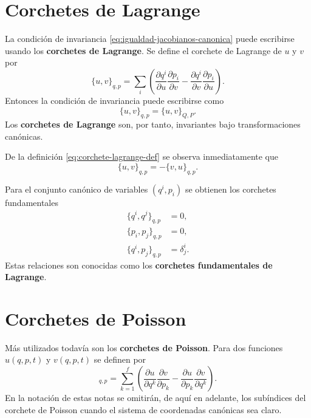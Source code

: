 \documentclass[../apunte_mecanica_clasica.tex]{subfiles}
\begin{document}
\section{Corchetes de Lagrange}

La condición de invariancia \eqref{eq:igualdad-jacobianos-canonica} puede escribirse usando los \textbf{corchetes de Lagrange}. Se define el corchete de Lagrange de $u$ y $v$ por
\begin{equation}
    \{u,v\}_{q,p}
    =
    \sum_i
    \left(
    \frac{\partial q^i}{\partial u}\frac{\partial p_i}{\partial v}
    -
    \frac{\partial q^i}{\partial v}\frac{\partial p_i}{\partial u}
    \right).
    \label{eq:corchete-lagrange-def}
\end{equation}
Entonces la condición de invariancia puede escribirse como
\begin{equation}
    \{u,v\}_{q,p}=\{u,v\}_{Q,P}.
    \label{eq:invariancia-corchetes-lagrange}
\end{equation}
Los \textbf{corchetes de Lagrange} son, por tanto, invariantes bajo transformaciones canónicas.

De la definición \eqref{eq:corchete-lagrange-def} se observa inmediatamente que
\begin{equation}
    \{u,v\}_{q,p}=-\{v,u\}_{q,p}.
    \label{eq:antisimetra-lagrange}
\end{equation}

Para el conjunto canónico de variables $(q^i,p_i)$ se obtienen los corchetes fundamentales
\begin{align}
    \{q^i,q^j\}_{q,p} &= 0,
    \label{eq:lagrange-qq} \\
    \{p_i,p_j\}_{q,p} &= 0,
    \label{eq:lagrange-pp} \\
    \{q^i,p_j\}_{q,p} &= \delta^i_j.
    \label{eq:lagrange-qp}
\end{align}
Estas relaciones son conocidas como los \textbf{corchetes fundamentales de Lagrange}.

\section{Corchetes de Poisson}

Más utilizados todavía son los \textbf{corchetes de Poisson}. Para dos funciones $u(q,p,t)$ y $v(q,p,t)$ se definen por
\begin{equation}
    [u,v]_{q,p}
    =
    \sum_{k=1}^{f}
    \left(
    \frac{\partial u}{\partial q^k}\frac{\partial v}{\partial p_k}
    -
    \frac{\partial u}{\partial p_k}\frac{\partial v}{\partial q^k}
    \right).
    \label{eq:corchete-poisson-def}
\end{equation}
En la notación de estas notas se omitirán, de aquí en adelante, los subíndices del corchete de Poisson cuando el sistema de coordenadas canónicas sea claro.
\end{document}
